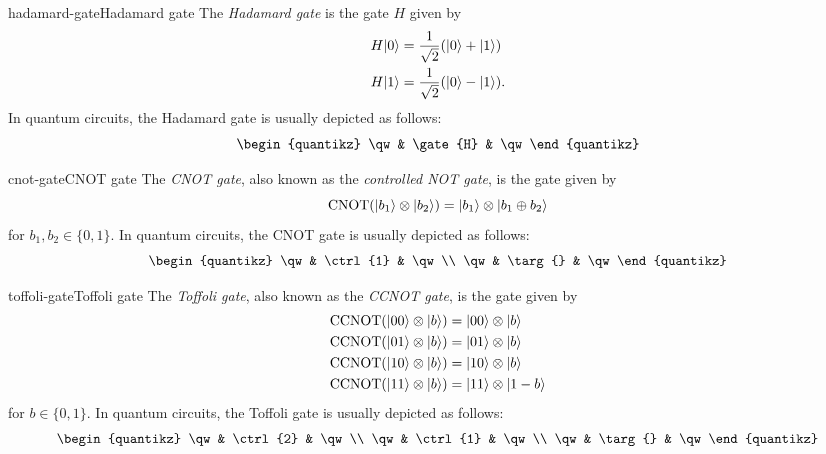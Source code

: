 \begin{topic}{hadamard-gate}{Hadamard gate}
    The \emph{Hadamard gate} is the  gate $H$ given by
    \[ \begin{aligned}
        H |0\rangle &= \frac{1}{\sqrt{2}} (|0\rangle + |1\rangle) \\
        H |1\rangle &= \frac{1}{\sqrt{2}} (|0\rangle - |1\rangle) .
    \end{aligned} \]
    In quantum circuits, the Hadamard gate is usually depicted as follows:
    \[ \svg \begin{quantikz}
        \qw & \gate{H} & \qw
    \end{quantikz} \]
\end{topic}

\begin{topic}{cnot-gate}{CNOT gate}
    The \emph{CNOT gate}, also known as the \emph{controlled NOT gate}, is the  gate given by
    \[ \textup{CNOT} (|b_1\rangle \otimes |b_2\rangle) = |b_1\rangle \otimes |b_1 \oplus b_2\rangle \]
    for $b_1, b_2 \in \{ 0, 1 \}$. In quantum circuits, the CNOT gate is usually depicted as follows:
    \[ \svg \begin{quantikz}
        \qw & \ctrl{1} & \qw \\
        \qw & \targ{} & \qw
    \end{quantikz} \]
\end{topic}

\begin{topic}{toffoli-gate}{Toffoli gate}
    The \emph{Toffoli gate}, also known as the \emph{CCNOT gate}, is the  gate given by
    \[ \begin{aligned}
        \textup{CCNOT} (|00\rangle \otimes |b\rangle) &= |00\rangle \otimes |b\rangle \\
        \textup{CCNOT} (|01\rangle \otimes |b\rangle) &= |01\rangle \otimes |b\rangle \\
        \textup{CCNOT} (|10\rangle \otimes |b\rangle) &= |10\rangle \otimes |b\rangle \\
        \textup{CCNOT} (|11\rangle \otimes |b\rangle) &= |11\rangle \otimes |1 - b\rangle
    \end{aligned} \]
    for $b \in \{ 0, 1 \}$. In quantum circuits, the Toffoli gate is usually depicted as follows:
    \[ \svg \begin{quantikz}
        \qw & \ctrl{2} & \qw \\
        \qw & \ctrl{1} & \qw \\
        \qw & \targ{} & \qw
    \end{quantikz} \]
\end{topic}

